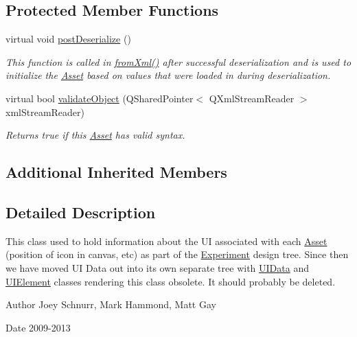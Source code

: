 \subsection*{Protected Member Functions}
\begin{DoxyCompactItemize}
\item 
virtual void \hyperlink{class_picto_1_1_u_i_info_ad3e5289eda4fb9d0d1f28a3fe8b10894}{post\-Deserialize} ()
\begin{DoxyCompactList}\small\item\em This function is called in \hyperlink{class_picto_1_1_asset_a8bed4da09ecb1c07ce0dab313a9aba67}{from\-Xml()} after successful deserialization and is used to initialize the \hyperlink{class_picto_1_1_asset}{Asset} based on values that were loaded in during deserialization. \end{DoxyCompactList}\item 
virtual bool \hyperlink{class_picto_1_1_u_i_info_a4e68484037ffb5b94e6f9b49c5ae0384}{validate\-Object} (Q\-Shared\-Pointer$<$ Q\-Xml\-Stream\-Reader $>$ xml\-Stream\-Reader)
\begin{DoxyCompactList}\small\item\em Returns true if this \hyperlink{class_picto_1_1_asset}{Asset} has valid syntax. \end{DoxyCompactList}\end{DoxyCompactItemize}
\subsection*{Additional Inherited Members}


\subsection{Detailed Description}
This class used to hold information about the U\-I associated with each \hyperlink{class_picto_1_1_asset}{Asset} (position of icon in canvas, etc) as part of the \hyperlink{class_picto_1_1_experiment}{Experiment} design tree. Since then we have moved U\-I Data out into its own separate tree with \hyperlink{class_picto_1_1_u_i_data}{U\-I\-Data} and \hyperlink{class_picto_1_1_u_i_element}{U\-I\-Element} classes rendering this class obsolete. It should probably be deleted. 

\begin{DoxyAuthor}{Author}
Joey Schnurr, Mark Hammond, Matt Gay 
\end{DoxyAuthor}
\begin{DoxyDate}{Date}
2009-\/2013 
\end{DoxyDate}


